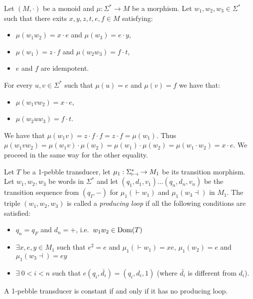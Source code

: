 \begin{lemma}
Let $(M,\cdot)$ be a monoid and $\mu:\Sigma^*\to M$ be a morphism. Let $w_1,w_2, w_3\in\Sigma^*$ such that there exits $x,y,z,t,e,f\in M$ satisfying:
\begin{itemize}
\item $\mu(w_1w_2)=x\cdot e$ and $\mu(w_3)=e\cdot y$,
\item $\mu(w_1)=z\cdot f$ and $\mu(w_2w_3)=f\cdot t$,
\item $e$ and $f$ are idempotent.
\end{itemize}
For every $u, v\in\Sigma^*$ such that $\mu(u)=e$ and $\mu(v)=f$ we have that:
\begin{itemize}
\item $\mu(w_1vw_2)=x\cdot e$, 
\item $\mu(w_2uw_3)=f\cdot t$.
\end{itemize}
\end{lemma}

\begin{pr}
We have that $\mu(w_1v)=z\cdot f\cdot f=z\cdot f=\mu(w_1)$.
Thus $\mu(w_1vw_2)=\mu(w_1v)\cdot \mu(w_2)=\mu(w_1)\cdot \mu(w_2)=\mu(w_1\cdot w_2) =x\cdot e$.
We proceed in the same way for the other equality.
\end{pr}

\begin{definition}
Let $T$ be a 1-pebble transducer, let $\mu_1:\Sigma_{\vdash \dashv}^*\rightarrow M_1$ be its transition morphism.
Let $w_1,w_2, w_3$ be words in $\Sigma^*$ and let $(q_1,d_1,v_1)\ldots (q_n,d_n,v_n)$ be the transition sequence from $(q_I,{-})$ for $\mu_1({\vdash} w_1)$ and $\mu_1(w_3{\dashv})$ in $M_1$.
The triple $(w_1,w_2,w_3)$ is called a \emph{producing loop} if all the following conditions are satisfied:
\begin{itemize}
\item $q_n=q_F$ and $d_n={+}$, i.e.~$w_1w_2\in \operatorname{\mathrm{Dom}}(T)$
\item $\exists x,e,y\in M_1$ such that $e^2=e$ and $\mu_1({\vdash} w_1)=xe$, $\mu_1(w_2)=e$ and $\mu_1(w_3{\dashv})=ey$
\item $\exists\ 0<i<n$ such that $e(q_i,\bar{d_i})=(q_i,d_i,1)$ (where $\bar{d_i}$ is different from $d_i$).
\end{itemize}
\end{definition}

\begin{theorem}
A 1-pebble transducer is constant if and only if it has no producing loop.
\end{theorem}